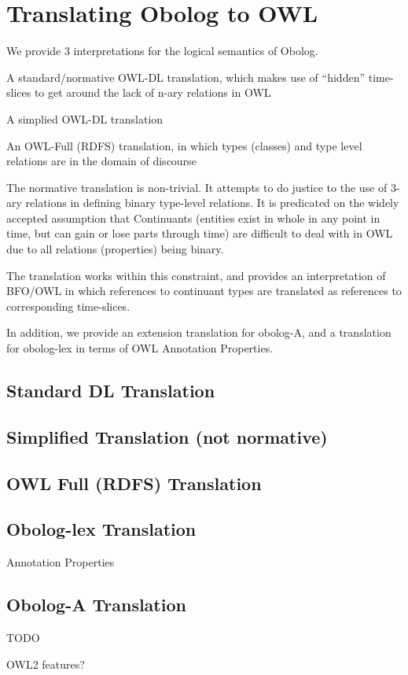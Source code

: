 \section{Translating Obolog to OWL}

We provide 3 interpretations for the logical semantics of Obolog.

\begin{clist}
\item A standard/normative OWL-DL translation, which makes use of ``hidden'' time-slices to get around the lack of n-ary relations in OWL
\item A simplied OWL-DL translation
\item An OWL-Full (RDFS) translation, in which types (classes) and type level relations are in the domain of discourse
\end{clist}

The normative translation is non-trivial. It attempts to do justice to
the use of 3-ary relations in defining binary type-level relations. It
is predicated on the widely accepted assumption that Continuants
(entities exist in whole in any point in time, but can gain or lose
parts through time) are difficult to deal with in OWL due to all
relations (properties) being binary.

The translation works within this constraint, and provides an
interpretation of BFO/OWL in which references to continuant types are
translated as references to corresponding time-slices.

In addition, we provide an extension translation for obolog-A, and a
translation for obolog-lex in terms of OWL Annotation Properties.

\subsection{Standard DL Translation}



\subsection{Simplified Translation (not normative)}



\subsection{OWL Full (RDFS) Translation}



\subsection{Obolog-lex Translation}

Annotation Properties

\subsection{Obolog-A Translation}

TODO

OWL2 features?